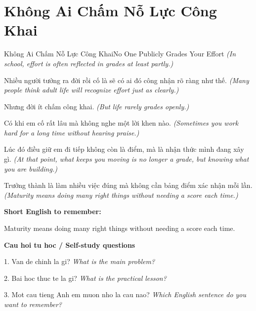 \section{Không Ai Chấm Nỗ Lực Công Khai}
\begin{truyen}{Không Ai Chấm Nỗ Lực Công Khai}{No One Publicly Grades Your Effort}
\textit{(In school, effort is often reflected in grades at least partly.)}

Nhiều người tưởng ra đời rồi cố là sẽ có ai đó công nhận rõ ràng như thế.
\textit{(Many people think adult life will recognize effort just as clearly.)}

Nhưng đời ít chấm công khai.
\textit{(But life rarely grades openly.)}

Có khi em cố rất lâu mà không nghe một lời khen nào.
\textit{(Sometimes you work hard for a long time without hearing praise.)}

Lúc đó điều giữ em đi tiếp không còn là điểm, mà là nhận thức mình đang xây gì.
\textit{(At that point, what keeps you moving is no longer a grade, but knowing what you are building.)}

\end{truyen}

\begin{baihoc}
Trưởng thành là làm nhiều việc đúng mà không cần bảng điểm xác nhận mỗi lần.
\textit{(Maturity means doing many right things without needing a score each time.)}
\end{baihoc}

\begin{ghinhoanh}
\textbf{Short English to remember:}

Maturity means doing many right things without needing a score each time.

\end{ghinhoanh}

\begin{tuhocnhanh}
\textbf{Cau hoi tu hoc / Self-study questions}

1. Van de chinh la gi? \textit{What is the main problem?}

2. Bai hoc thuc te la gi? \textit{What is the practical lesson?}

3. Mot cau tieng Anh em muon nho la cau nao? \textit{Which English sentence do you want to remember?}
\end{tuhocnhanh}
